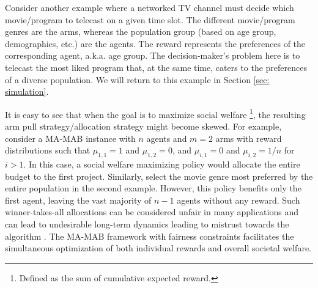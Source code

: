 Consider another example where a networked TV channel must decide which movie/program to telecast on  a given time slot. The different movie/program genres are the arms, whereas the  population group (based on age group, demographics, etc.) are the agents. The reward represents the preferences of the corresponding agent, a.k.a. age group.  The decision-maker's problem here is to telecast the most liked program that, at the same time, caters to the preferences of a diverse population.  We will return to this example in Section \ref{sec: simulation}. 
  


It is easy to see that when the goal is to maximize social welfare  \footnote{ Defined as the sum of cumulative expected reward.},  the resulting arm pull  strategy/allocation strategy  might become skewed. For example, consider a MA-MAB instance with \( n \) agents and \( m=2 \)  arms with  reward distributions such that \(\mu_{1,1} =1\) and \(\mu_{1,2} =0\), and \(\mu_{i,1} =0\) and \(\mu_{i,2} = 1/n\) for \(i >  1\). In this case, a social welfare maximizing  policy  would allocate the entire budget to the first project. Similarly,  select the movie genre most preferred by the entire population in the second example. However, this policy benefits only the first agent, leaving the vast majority of \(n-1\) agents without any reward.  Such winner-takes-all allocations can be considered unfair in many applications and can lead to undesirable long-term dynamics leading to mistrust towards the algorithm \cite{Hossain2020FairAF}.     %
The  MA-MAB framework with fairness constraints facilitates the simultaneous optimization of both individual rewards and overall societal welfare.







